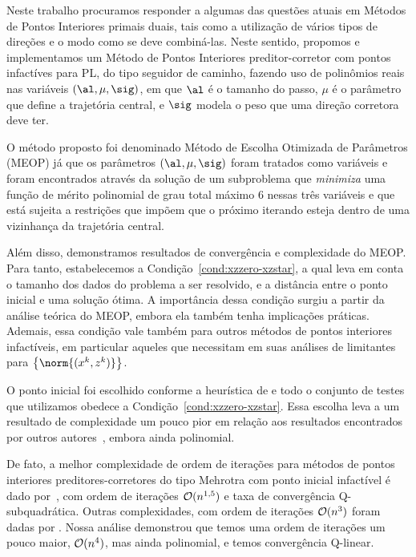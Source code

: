 \label{chap:final_remarks}






Neste trabalho procuramos responder a algumas das questões atuais em Métodos de Pontos Interiores primais duais, tais como a utilização de vários tipos de direções e o modo como se deve combiná-las. Neste sentido,  propomos e implementamos  um Método de Pontos Interiores preditor-corretor com pontos infactíves para \ac{PL}, do tipo seguidor de caminho, fazendo  uso de polinômios reais nas variáveis $(\al,\mu,\sig)$, em que $\al$ é o tamanho do passo, $\mu$ é o parâmetro que define a trajetória central, e $\sig$ modela o peso que uma direção corretora deve ter. 

O método proposto foi denominado Método de Escolha Otimizada de Parâmetros (MEOP) já que os  parâmetros $(\al,\mu,\sig)$ foram tratados como variáveis e foram encontrados  através da solução de um subproblema que \emph{minimiza} uma função de mérito polinomial de grau total máximo 6 nessas três variáveis e que está sujeita a restrições que impõem que o próximo iterando esteja dentro de uma vizinhança da trajetória central. 



Além disso, demonstramos resultados de convergência e complexidade do MEOP. Para tanto, estabelecemos a  Condição~\ref{cond:xzzero-xzstar}, a qual leva em conta o tamanho dos dados do problema a  ser  resolvido, e a distância entre o ponto inicial e uma solução ótima. A importância dessa condição surgiu a partir da análise teórica do MEOP, embora ela também tenha implicações práticas.  Ademais, essa condição vale também para outros métodos de pontos interiores infactíveis, em particular aqueles que necessitam em suas análises de limitantes para $\left\{\norm{(\xk,\zk)}\right\}$.

O ponto inicial foi escolhido  conforme a heurística de \textcite{Mehrotra:1992wr} e todo o conjunto de testes que utilizamos obedece a Condição~\ref{cond:xzzero-xzstar}.  Essa escolha leva a um   resultado de complexidade um pouco pior  em relação aos resultados encontrados por outros autores~\cite{Zhang:1995fu,Zhang:2006ic,Wright:1993je,Wright:1996kj}, embora ainda polinomial.


De fato, a melhor complexidade de ordem de iterações para métodos de pontos interiores preditores-corretores do tipo Mehrotra com ponto inicial infactível é dado por~\textcite{Zhang:1996it}, com ordem de iterações $\mathcal{O}(n^{\num{1.5}})$ e taxa de convergência Q-subquadrática. Outras complexidades, com ordem de iterações $\mathcal{O}(n^{\num{3}})$ foram dadas por \textcite{Zhang:2006ic,Wright:1996kj}. Nossa análise demonstrou que temos uma ordem de iterações um pouco maior, $\mathcal{O}(n^{\num{4}})$, mas ainda polinomial, e temos convergência Q-linear. 

